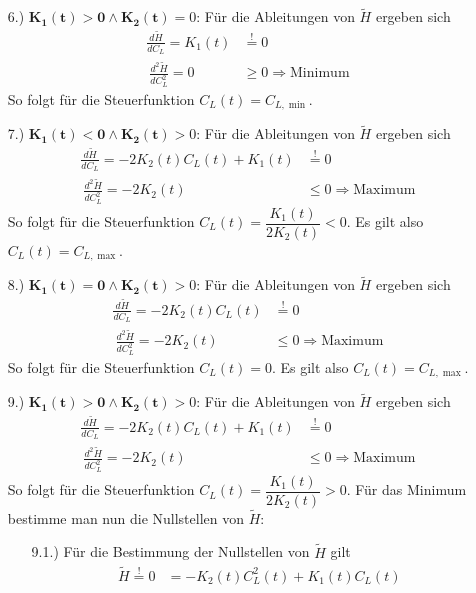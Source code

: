 \begin{enumerate}
\begin{enumerate}
        \item[6.)] $\mathbf{K_1(t) > 0 \wedge K_2(t)} = 0$: Für die Ableitungen von $\tilde{H}$ ergeben sich
        \[\begin{split}
        \frac{d \tilde{H}}{d C_L} = K_1(t) &\stackrel{!}{=} 0 \\\
        \frac{d^2 \tilde{H}}{d C_L^2} = 0 &\geq 0 \Rightarrow \text{Minimum}
        \end{split}\]
        So folgt für die Steuerfunktion $C_L(t) = C_{L, \min}$.
        \item[7.)] $\mathbf{K_1(t) < 0 \wedge K_2(t)} > 0$: Für die Ableitungen von $\tilde{H}$ ergeben sich
        \[\begin{split}
        \frac{d \tilde{H}}{d C_L} = - 2 K_2(t) C_L(t) + K_1(t) &\stackrel{!}{=} 0 \\\
        \frac{d^2 \tilde{H}}{d C_L^2} = - 2 K_2(t) &\leq 0 \Rightarrow \text{Maximum}
        \end{split}\]
        So folgt für die Steuerfunktion $C_L(t) = \dfrac{K_1(t)}{2 K_2(t)} < 0$. Es gilt also $C_L(t) = C_{L, \max}$.
        \item[8.)] $\mathbf{K_1(t) = 0 \wedge K_2(t)} > 0$: Für die Ableitungen von $\tilde{H}$ ergeben sich
        \[\begin{split}
        \frac{d \tilde{H}}{d C_L} = - 2 K_2(t) C_L(t) &\stackrel{!}{=} 0 \\\
        \frac{d^2 \tilde{H}}{d C_L^2} = - 2 K_2(t) &\leq 0 \Rightarrow \text{Maximum}
        \end{split}\]
        So folgt für die Steuerfunktion $C_L(t) = 0$. Es gilt also $C_L(t) = C_{L, \max}$.
\item[9.)] $\mathbf{K_1(t) > 0 \wedge K_2(t)} > 0$: Für die Ableitungen von $\tilde{H}$ ergeben sich
\[\begin{split}
\frac{d \tilde{H}}{d C_L} = - 2 K_2(t) C_L(t) + K_1(t) &\stackrel{!}{=} 0 \\\
\frac{d^2 \tilde{H}}{d C_L^2} = - 2 K_2(t) &\leq 0 \Rightarrow \text{Maximum}
\end{split}\]
So folgt für die Steuerfunktion $C_L(t) = \dfrac{K_1(t)}{2 K_2(t)} > 0$. Für das Minimum bestimme man nun die Nullstellen von $\tilde{H}$:
\begin{enumerate}
\item[9.1.)] Für die Bestimmung der Nullstellen von $\tilde{H}$ gilt
\[\begin{split}
\tilde{H} \stackrel{!}{=} 0 &= - K_2(t) C_L^2(t) + K_1(t)C_L(t) \\\

\end{split}\]
\end{enumerate}
\end{enumerate}
\end{enumerate}
